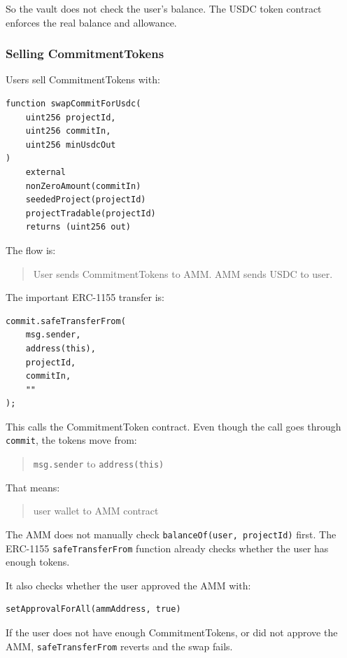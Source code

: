 \documentclass[11pt,a4paper]{article}
\begin{document}
So the vault does not check the user's balance. The USDC token contract enforces the real balance and allowance.

\subsubsection{Selling CommitmentTokens}

Users sell CommitmentTokens with:

\begin{lstlisting}
function swapCommitForUsdc(
    uint256 projectId,
    uint256 commitIn,
    uint256 minUsdcOut
)
    external
    nonZeroAmount(commitIn)
    seededProject(projectId)
    projectTradable(projectId)
    returns (uint256 out)
\end{lstlisting}

The flow is:

\begin{quote}
User sends CommitmentTokens to AMM. AMM sends USDC to user.
\end{quote}

The important ERC-1155 transfer is:

\begin{lstlisting}
commit.safeTransferFrom(
    msg.sender,
    address(this),
    projectId,
    commitIn,
    ""
);
\end{lstlisting}

This calls the CommitmentToken contract. Even though the call goes through \texttt{commit}, the tokens move from:

\begin{quote}
\texttt{msg.sender} to \texttt{address(this)}
\end{quote}

That means:

\begin{quote}
user wallet to AMM contract
\end{quote}

The AMM does not manually check \texttt{balanceOf(user, projectId)} first. The ERC-1155 \texttt{safeTransferFrom} function already checks whether the user has enough tokens.

It also checks whether the user approved the AMM with:

\begin{lstlisting}
setApprovalForAll(ammAddress, true)
\end{lstlisting}

If the user does not have enough CommitmentTokens, or did not approve the AMM, \texttt{safeTransferFrom} reverts and the swap fails.
\end{document}
